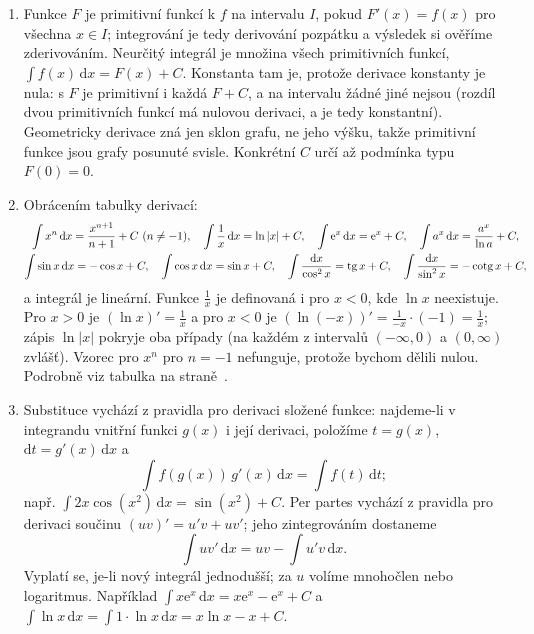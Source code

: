 \begin{enumerate}[label=\textbf{\arabic*.}, leftmargin=*, itemsep=0.8em]
  \item {}
  Funkce $F$ je primitivní funkcí k $f$ na intervalu $I$, pokud $F'(x) = f(x)$ pro všechna $x\in I$; integrování je tedy derivování pozpátku a výsledek si ověříme zderivováním. Neurčitý integrál je množina všech primitivních funkcí, $\int f(x)\,\mathrm{d}x = F(x) + C$. Konstanta tam je, protože derivace konstanty je nula: s $F$ je primitivní i každá $F + C$, a na intervalu žádné jiné nejsou (rozdíl dvou primitivních funkcí má nulovou derivaci, a je tedy konstantní). Geometricky derivace zná jen sklon grafu, ne jeho výšku, takže primitivní funkce jsou grafy posunuté svisle. Konkrétní $C$ určí až podmínka typu $F(0) = 0$. 

  \item {}
  Obrácením tabulky derivací:
  \begin{gather*}
    \int x^n\,\mathrm{d}x = \frac{x^{n+1}}{n + 1} + C\ (n\neq -1),\quad \int\frac{1}{x}\,\mathrm{d}x = \ln|x| + C,\quad \int\mathrm{e}^x\,\mathrm{d}x = \mathrm{e}^x + C,\quad \int a^x\,\mathrm{d}x = \frac{a^x}{\ln a} + C,\\
    \int\sin x\,\mathrm{d}x = -\cos x + C,\quad \int\cos x\,\mathrm{d}x = \sin x + C,\quad \int\frac{\mathrm{d}x}{\cos^2 x} = \operatorname{tg} x + C,\quad \int\frac{\mathrm{d}x}{\sin^2 x} = -\operatorname{cotg} x + C,
  \end{gather*}
  a integrál je lineární. Funkce $\frac{1}{x}$ je definovaná i pro $x < 0$, kde $\ln x$ neexistuje. Pro $x > 0$ je $(\ln x)' = \frac{1}{x}$ a pro $x < 0$ je ${\left(\ln(-x)\right)}' = \frac{1}{-x}\cdot(-1) = \frac{1}{x}$; zápis $\ln|x|$ pokryje oba případy (na každém z intervalů $(-\infty, 0)$ a $(0, \infty)$ zvlášť). Vzorec pro $x^n$ pro $n = -1$ nefunguje, protože bychom dělili nulou. Podrobně viz tabulka na straně~\pageref{def:zakladni-integraly}.

  \item {}
  Substituce vychází z pravidla pro derivaci složené funkce: najdeme-li v integrandu vnitřní funkci $g(x)$ i její derivaci, položíme $t = g(x)$, $\mathrm{d}t = g'(x)\,\mathrm{d}x$ a
  \begin{equation*}
    \int f(g(x))\,g'(x)\,\mathrm{d}x = \int f(t)\,\mathrm{d}t;
  \end{equation*}
  např. $\int 2x\cos(x^2)\,\mathrm{d}x = \sin(x^2) + C$. Per partes vychází z pravidla pro derivaci součinu $(uv)' = u'v + uv'$; jeho zintegrováním dostaneme
  \begin{equation*}
    \int uv'\,\mathrm{d}x = uv - \int u'v\,\mathrm{d}x.
  \end{equation*}
  Vyplatí se, je-li nový integrál jednodušší; za $u$ volíme mnohočlen nebo logaritmus. Například $\int x\mathrm{e}^x\,\mathrm{d}x = x\mathrm{e}^x - \mathrm{e}^x + C$ a $\int\ln x\,\mathrm{d}x = \int 1\cdot\ln x\,\mathrm{d}x = x\ln x - x + C$. 


\end{enumerate}
